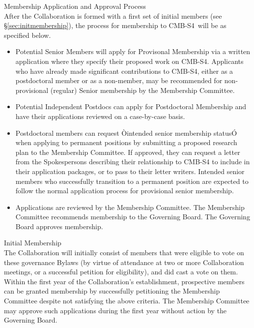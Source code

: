 \documentclass[12pt]{article}
\newcommand\collabname{CMB-S4}
\begin{document}
{{{\large {} Membership Application and Approval Process}\\

After the Collaboration is formed with a first set of initial members (see \S\ref{sec:initmembership}), the process for membership to \collabname\ will be as specified below.

\begin{itemize}

\item Potential Senior Members will apply for Provisonal Membership via a written application where they specify their proposed work on \collabname. Applicants who have already made significant contributions to CMB-S4, either as a postdoctoral member or as a non-member, may be recommended for non-provisional (regular) Senior membership by the Membership Committee.


\item Potential Independent Postdocs can apply for Postdoctoral Membership and have their applications reviewed on a case-by-case basis.
  
\item Postdoctoral members can request Òintended senior membership statusÓ when applying to permanent positions by submitting a proposed research plan to the Membership Committee. If approved, they can request a letter from the Spokespersons describing their relationship to CMB-S4 to include in their application packages, or to pass to their letter writers.  Intended senior members who successfully transition to a permanent position are expected to follow the normal application process for provisional senior membership.

\item Applications are reviewed by the Membership Committee. The Membership Committee recommends membership to the Governing Board.  The Governing Board approves membership.

\end{itemize}

{\large {} Initial Membership}\\

The Collaboration will initially consist of members that were eligible to vote on these governance Bylaws (by virtue of attendance at two or more Collaboration meetings, or a successful petition for eligibility), and did cast a vote on them. Within the first year of the Collaboration's establishment, prospective members can be granted membership by successfully petitioning the Membership Committee despite not satisfying the above criteria.  The Membership Committee may approve such applications during the first year without action by the Governing Board.  

}}
\end{document}
